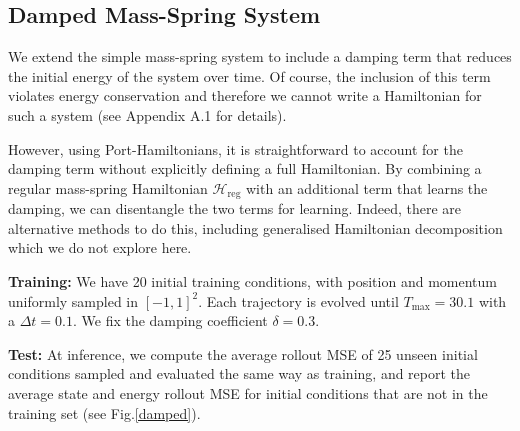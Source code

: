 \documentclass[twoside]{article}
\begin{document}
\subsection{Damped Mass-Spring System}

We extend the simple mass-spring system to include a damping term that reduces the initial energy of the system over time. Of course, the inclusion of this term violates energy conservation and therefore we cannot write a Hamiltonian for such a system (see Appendix A.1 for details). 

However, using Port-Hamiltonians, it is straightforward to account for the damping term without explicitly defining a full Hamiltonian. By combining a regular mass-spring Hamiltonian $\mathcal{H}_{\mathrm{reg}}$ with an additional term that learns the damping, we can disentangle the two terms for learning. Indeed, there are alternative methods to do this, including generalised Hamiltonian decomposition which we do not explore here.

\textbf{Training:} We have 20 initial training conditions, with position and momentum uniformly sampled in $[-1,1]^2$. Each trajectory is evolved until $T_{\max} = 30.1$ with a $\Delta t = 0.1$. We fix the damping coefficient $\delta = 0.3$.

\textbf{Test:} At inference, we compute the average rollout MSE of 25 unseen initial conditions sampled and evaluated the same way as training, and report the average state and energy rollout MSE for initial conditions that are not in the training set (see Fig.\ref{damped}).
\end{document}
